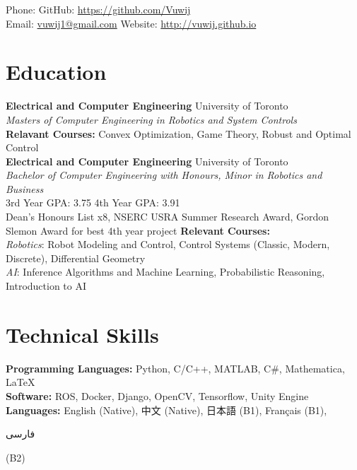 \documentclass[11pt, a4paper]{cv}
\renewcommand*{\name}{\fontsize{24}{40}\mdseries\upshape}
\begin{document}
\begin{center}
\name{Jason Wang}
\end{center}


Phone: \texttt{} \hfill
GitHub: \href{https://github.com/Vuwij}{https://github.com/Vuwij}\\
Email: \href{mailto:vuwij1@gmail.com}{vuwij1@gmail.com}\hfill
Website: \href{http://vuwij.github.io}{http://vuwij.github.io}

\section*{Education}
\textbf{Electrical and Computer Engineering}
\hfill University of Toronto\\
\emph{Masters of Computer Engineering in Robotics and System Controls}\\
\small{\textbf{Relavant Courses:} Convex Optimization, Game Theory, Robust and Optimal Control}\\

\textbf{Electrical and Computer Engineering} \hfill University of Toronto\\
\emph{Bachelor of Computer Engineering with Honours, Minor in Robotics and Business}\\
\small{
	3rd Year GPA: 3.75\hspace{1em}
	4th Year GPA: 3.91\hspace{1em}\\
Dean's Honours List x8, NSERC USRA Summer Research Award, Gordon Slemon Award for best 4th year project
}
\small{\textbf{Relevant Courses:} \\
	\textit{Robotics}: Robot Modeling and Control, Control Systems (Classic, Modern, Discrete), Differential Geometry\\
	\textit{AI}: Inference Algorithms and Machine Learning, Probabilistic Reasoning, Introduction to AI}


\section*{Technical Skills}
\textbf{Programming Languages:} Python, C/C++, MATLAB, C\#, Mathematica, \LaTeX\\[0.2em]
\textbf{Software:} ROS, Docker, Django, OpenCV, Tensorflow, Unity Engine\\[0.2em]
\textbf{Languages:} English (Native), 中文 (Native), 日本語 (B1), Français (B1), \begin{farsi}فارسی\end{farsi} (B2)
\end{document}
